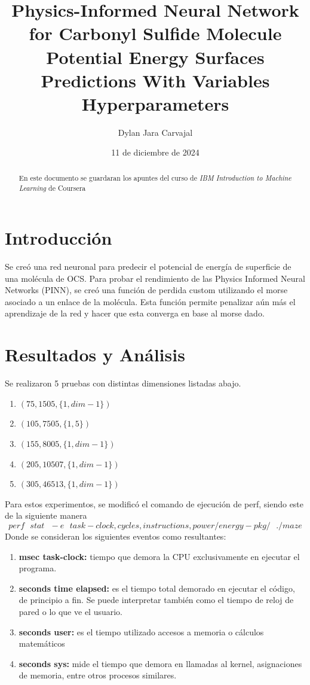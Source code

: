 \documentclass{article}
\title{Physics-Informed Neural Network for Carbonyl Sulfide Molecule Potential Energy Surfaces Predictions With Variables Hyperparameters}
\author[1]{Dylan Jara Carvajal}
\affil[1]{Departamento de Matemática y Ciencia de la Computación\\Universidad de Santiago de Chile}
\date{11 de diciembre de 2024}
\begin{document}
\maketitle

\begin{abstract}
    En este documento se guardaran los apuntes del curso de \textit{IBM Introduction to Machine Learning} de Coursera
\end{abstract}


\section{Introducción} Se creó una red neuronal para predecir el potencial de energía de superficie de una molécula de OCS. Para probar el rendimiento de las Physics Informed Neural Networks (PINN), se creó una función de perdida custom utilizando el morse asociado a un enlace de la molécula. Esta función permite penalizar aún más el aprendizaje de la red y hacer que esta converga en base al morse dado.

\section{Resultados y Análisis}

Se realizaron 5 pruebas con distintas dimensiones listadas abajo. 
\begin{enumerate}
    \item [1] $(75,1505,\{1,dim-1\})$
    \item [2] $(105,7505,\{1,5\})$
    \item [3] $(155,8005,\{1,dim-1\})$
    \item [4] $(205,10507,\{1,dim-1\})$
    \item [5] $(305,46513,\{1,dim-1\})$
\end{enumerate}

Para estos experimentos, se modificó el comando de ejecución de perf, siendo este de la siguiente manera
$$perf\text{ }stat\text{ }-e\text{ }task-clock,cycles, instructions,power/energy-pkg/\text{ }./maze$$
Donde se consideran los siguientes eventos como resultantes:
\begin{enumerate}
    \item \textbf{msec task-clock:} tiempo que demora la CPU exclusivamente en ejecutar el programa. 
    \item \textbf{seconds time elapsed:} es el tiempo total demorado en ejecutar el código, de principio a fin. Se puede interpretar también como el tiempo de reloj de pared o lo que ve el usuario.
    \item \textbf{seconds user:} es el tiempo utilizado accesos a memoria o cálculos matemáticos
    \item \textbf{seconds sys:} mide el tiempo que demora en llamadas al kernel, asignaciones de memoria, entre otros procesos similares.
\end{enumerate}
\end{document}
